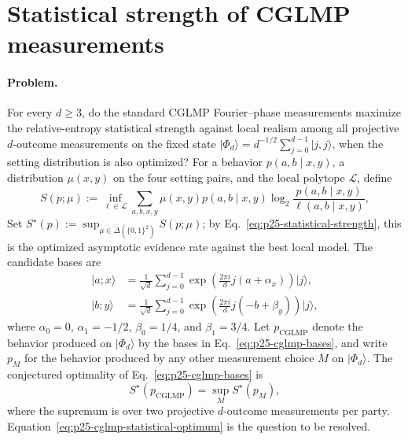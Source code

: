 \section{Statistical strength of CGLMP measurements}
\label{sec:problem-25}

\paragraph{Problem.}
For every $d\geq3$, do the standard CGLMP Fourier--phase measurements maximize
the relative-entropy statistical strength against local realism among all
projective $d$-outcome measurements on the fixed state
$\lvert\Phi_d\rangle=d^{-1/2}\sum_{j=0}^{d-1}\lvert j,j\rangle$, when the
setting distribution is also optimized?  For a behavior $p(a,b\mid x,y)$, a
distribution $\mu(x,y)$ on the four setting pairs, and the local polytope
$\mathcal L$, define
\begin{equation}
  S(p;\mu)
  :=\inf_{\ell\in\mathcal L}
    \sum_{a,b,x,y}\mu(x,y)p(a,b\mid x,y)
    \log_2\!\frac{p(a,b\mid x,y)}{\ell(a,b\mid x,y)},
  \label{eq:p25-statistical-strength}
\end{equation}
Set $S^\star(p):=\sup_{\mu\in\Delta(\{0,1\}^2)}S(p;\mu)$; by
Eq.~\eqref{eq:p25-statistical-strength}, this is the optimized asymptotic
evidence rate against the best local model.  The candidate bases are
\begin{equation}
  \begin{aligned}
    \lvert a;x\rangle
      &=\frac{1}{\sqrt d}\sum_{j=0}^{d-1}
        \exp\!\left(\frac{2\pi i}{d}j(a+\alpha_x)\right)\lvert j\rangle,\\
    \lvert b;y\rangle
      &=\frac{1}{\sqrt d}\sum_{j=0}^{d-1}
        \exp\!\left(\frac{2\pi i}{d}j(-b+\beta_y)\right)\lvert j\rangle,
  \end{aligned}
  \label{eq:p25-cglmp-bases}
\end{equation}
where $\alpha_0=0$, $\alpha_1=-1/2$, $\beta_0=1/4$, and $\beta_1=3/4$.
Let $p_{\mathrm{CGLMP}}$ denote the behavior produced on
$\lvert\Phi_d\rangle$ by the bases in Eq.~\eqref{eq:p25-cglmp-bases}, and
write $p_M$ for the behavior produced by any other measurement choice $M$ on
$\lvert\Phi_d\rangle$.  The conjectured optimality of
Eq.~\eqref{eq:p25-cglmp-bases} is
\begin{equation}
  S^\star(p_{\mathrm{CGLMP}})
  =\sup_M S^\star(p_M),
  \label{eq:p25-cglmp-statistical-optimum}
\end{equation}
where the supremum is over two projective $d$-outcome measurements per party.
Equation~\eqref{eq:p25-cglmp-statistical-optimum} is the question to be
resolved.

